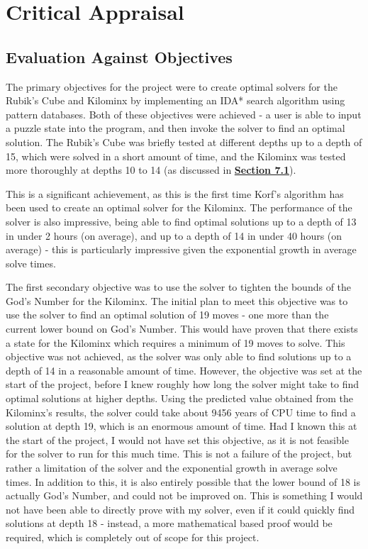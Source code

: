 \section{Critical Appraisal}
\subsection{Evaluation Against Objectives}
The primary objectives for the project were to create optimal solvers for the Rubik's Cube and Kilominx by implementing an IDA* search algorithm using pattern databases. Both of these objectives were achieved - a user is able to input a puzzle state into the program, and then invoke the solver to find an optimal solution. The Rubik's Cube was briefly tested at different depths up to a depth of 15, which were solved in a short amount of time, and the Kilominx was tested more thoroughly at depths 10 to 14 (as discussed in \textbf{\hyperref[section:experiment]{Section 7.1}}).

This is a significant achievement, as this is the first time Korf's algorithm has been used to create an optimal solver for the Kilominx. The performance of the solver is also impressive, being able to find optimal solutions up to a depth of 13 in under 2 hours (on average), and up to a depth of 14 in under 40 hours (on average) - this is particularly impressive given the exponential growth in average solve times.

The first secondary objective was to use the solver to tighten the bounds of the God's Number for the Kilominx. The initial plan to meet this objective was to use the solver to find an optimal solution of 19 moves - one more than the current lower bound on God's Number. This would have proven that there exists a state for the Kilominx which requires a minimum of 19 moves to solve. This objective was not achieved, as the solver was only able to find solutions up to a depth of 14 in a reasonable amount of time. However, the objective was set at the start of the project, before I knew roughly how long the solver might take to find optimal solutions at higher depths. Using the predicted value obtained from the Kilominx's results, the solver could take about 9456 years of CPU time to find a solution at depth 19, which is an enormous amount of time. Had I known this at the start of the project, I would not have set this objective, as it is not feasible for the solver to run for this much time. This is not a failure of the project, but rather a limitation of the solver and the exponential growth in average solve times. In addition to this, it is also entirely possible that the lower bound of 18 is actually God's Number, and could not be improved on. This is something I would not have been able to directly prove with my solver, even if it could quickly find solutions at depth 18 - instead, a more mathematical based proof would be required, which is completely out of scope for this project. 

